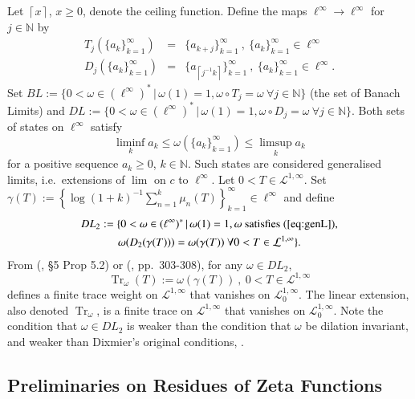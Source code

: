 \documentclass[final,1p]{elsarticle}
\numberwithin{equation}{section}
\theoremstyle{plain}
\theoremstyle{definition}
\begin{document}
\medskip Let ${\ensuremath{\left\lceil {x} \right\rceil}}$, $x \geq 0$, denote the ceiling function.
Define the maps $\ell^\infty \to \ell^\infty$ for $j \in {\ensuremath{\mathbb{N}}}$ by
\begin{eqnarray*}
T_j( \{a_k\}_{k=1}^\infty ) & = & \{ a_{k+j} \}_{k=1}^\infty \ , \
\{a_k\}_{k=1}^\infty \in \ell^\infty \ \\
D_j( \{a_k \}_{k=1}^\infty) & = & \{ a_{{\ensuremath{\left\lceil {j^{-1}k} \right\rceil}}} \}_{k=1}^\infty \ , \
\{a_k\}_{k=1}^\infty \in \ell^\infty .
\end{eqnarray*}
Set $BL := {\ensuremath{\{ {0 < \omega \in (\ell^{\infty})^*} \, | \, {\omega(1) = 1, \omega \circ T_j = \omega \ \forall j \in {\ensuremath{\mathbb{N}}}} \} }}$ (the set of Banach Limits)
and $DL := {\ensuremath{\{ {0 < \omega \in (\ell^{\infty})^*} \, | \, {\omega(1) = 1, \omega \circ D_j = \omega \ \forall j \in {\ensuremath{\mathbb{N}}}} \} }}$.
Both sets of states on $\ell^\infty$ satisfy
\begin{equation} \label{eq:genL}
\liminf_k a_k \leq \omega(\{ a_k \}_{k=1}^\infty) \leq \limsup_k a_k 
\end{equation}
for a positive sequence $a_k \geq 0$, $k \in {\ensuremath{\mathbb{N}}}$.  Such states
are considered generalised limits, i.e.~extensions of $\lim$ on $c$ to $\ell^\infty$.
Let $0 < T \in \mathcal{L}^{1,\infty}$.  Set $\gamma(T) := \left\{ \log(1+k)^{-1} \sum_{n=1}^k \mu_n(T)\right\}_{k=1}^\infty \in \ell^\infty$
and define
\begin{multline*}
DL_2 := \{ 0 < \omega \in (\ell^{\infty})^* \, | \, \omega(1) = 1,
\omega \text{ satisfies }(\ref{eq:genL}), \\
\omega(D_2(\gamma(T))) = \omega(\gamma(T)) \ \forall 0 < T \in \mathcal{L}^{1,\infty} \} .
\end{multline*}
From (\cite{AF}, \S 5 Prop 5.2) or (\cite{CN}, pp.~303-308), for any $\omega \in DL_2$,
$$
\operatorname{Tr}_\omega(T) := \omega(\gamma(T)) \ , \ 0 < T \in \mathcal{L}^{1,\infty}
$$
defines a finite trace weight on $\mathcal{L}^{1,\infty}$ that vanishes on $\mathcal{L}^{1,\infty}_0$.
The linear extension, also denoted $\operatorname{Tr}_\omega$, is a finite trace on $\mathcal{L}^{1,\infty}$  that vanishes on $\mathcal{L}^{1,\infty}_0$.  Note
the condition that $\omega \in DL_2$ is weaker than the condition that
$\omega$ be dilation invariant, and weaker than Dixmier's original conditions, \cite{Dix}.

\subsection{Preliminaries on Residues of Zeta Functions} \label{sec:res.1}
\end{document}
